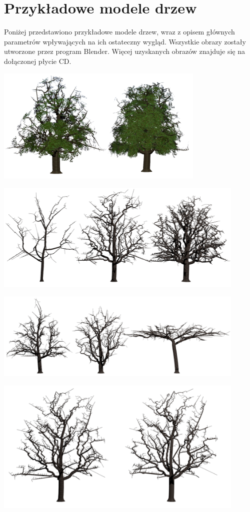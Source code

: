 \section{Przykładowe modele drzew}
Poniżej przedstawiono przykładowe modele drzew, wraz z opisem głównych parametrów wpływających na ich ostateczny wygląd.
Wszystkie obrazy zostały utworzone przez program Blender. Więcej uzyskanych obrazów znajduje się na dołączonej płycie CD.
\begin{center}
	\includegraphics[width=100mm]{images/renders/greentree.png}
\end{center}

\begin{center}
	\includegraphics[width=120mm]{images/renders/points.png}
\end{center}

\begin{center}
	\includegraphics[width=120mm]{images/renders/shape.png}
\end{center}

\begin{center}
	\includegraphics[width=120mm]{images/renders/smooth.png}
\end{center}


